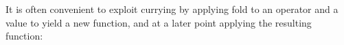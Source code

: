 It is often convenient to exploit currying by applying fold to an
operator and a value to yield a new function, and at a later point
applying the resulting function:

\begin{fence}
\begin{code}%
\>[0]\AgdaSpace{}%
\AgdaSymbol{:}\AgdaSpace{}%
\AgdaSpace{}%
\AgdaSpace{}%
\AgdaSpace{}%
\<%
\\
\>[0]\AgdaSpace{}%
\AgdaSymbol{=}\AgdaSpace{}%
\AgdaSpace{}%
\AgdaOperator{\AgdaPrimitive{\AgdaUnderscore{}+\AgdaUnderscore{}}}\AgdaSpace{}%
\<%
\\
%
\\[\AgdaEmptyExtraSkip]%
\>[0]\AgdaFunction{\AgdaUnderscore{}}\AgdaSpace{}%
\AgdaSymbol{:}\AgdaSpace{}%
\AgdaSpace{}%
\AgdaOperator{\AgdaInductiveConstructor{[}}\AgdaSpace{}%
\AgdaSpace{}%
\AgdaOperator{\AgdaInductiveConstructor{,}}\AgdaSpace{}%
\AgdaSpace{}%
\AgdaOperator{\AgdaInductiveConstructor{,}}\AgdaSpace{}%
\AgdaSpace{}%
\AgdaOperator{\AgdaInductiveConstructor{,}}\AgdaSpace{}%
\AgdaSpace{}%
\AgdaOperator{\AgdaInductiveConstructor{]}}\AgdaSpace{}%
\AgdaSpace{}%
\<%
\\
\>[0]\AgdaSymbol{\AgdaUnderscore{}}%
\>[1268I]\AgdaSymbol{=}\<%
\\
\>[.][@{}l@{}]\<[1268I]%
\>[2]\<%
\\
\>[2][@{}l@{\AgdaIndent{0}}]%
\>[4]\AgdaSpace{}%
\AgdaOperator{\AgdaInductiveConstructor{[}}\AgdaSpace{}%
\AgdaSpace{}%
\AgdaOperator{\AgdaInductiveConstructor{,}}\AgdaSpace{}%
\AgdaSpace{}%
\AgdaOperator{\AgdaInductiveConstructor{,}}\AgdaSpace{}%
\AgdaSpace{}%
\AgdaOperator{\AgdaInductiveConstructor{,}}\AgdaSpace{}%
\AgdaSpace{}%
\AgdaOperator{\AgdaInductiveConstructor{]}}\<%
\\
%
\>[2]\<%
\\
\>[2][@{}l@{\AgdaIndent{0}}]%
\>[4]\AgdaSpace{}%
\AgdaOperator{\AgdaPrimitive{\AgdaUnderscore{}+\AgdaUnderscore{}}}\AgdaSpace{}%
\AgdaSpace{}%
\AgdaOperator{\AgdaInductiveConstructor{[}}\AgdaSpace{}%
\AgdaSpace{}%
\AgdaOperator{\AgdaInductiveConstructor{,}}\AgdaSpace{}%
\AgdaSpace{}%
\AgdaOperator{\AgdaInductiveConstructor{,}}\AgdaSpace{}%
\AgdaSpace{}%
\AgdaOperator{\AgdaInductiveConstructor{,}}\AgdaSpace{}%
\AgdaSpace{}%
\AgdaOperator{\AgdaInductiveConstructor{]}}\<%
\\
%
\>[2]\<%
\\
\>[2][@{}l@{\AgdaIndent{0}}]%
\>[4]\<%
\\
%
\>[2]\<%
\end{code}
\end{fence}

